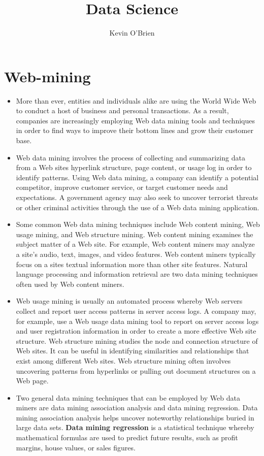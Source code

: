 \documentclass[12pt]{article}
\title{Data Science}
\author{Kevin O'Brien}
\begin{document}
	
	\section*{Web-mining}
	\begin{itemize}
	
	\item More than ever, entities and individuals alike are using the World Wide Web to conduct a host of business and personal transactions. As a result, companies are increasingly employing Web data mining tools and techniques in order to find ways to improve their bottom lines and grow their customer base.
	\item  Web data mining involves the process of collecting and summarizing data from a Web sites hyperlink structure, page content, or usage log in order to identify patterns. Using Web data mining, a company can identify a potential competitor, improve customer service, or target customer needs and expectations. A government agency may also seek to uncover terrorist threats or other criminal activities through the use of a Web data mining application.
	
\item	Some common Web data mining techniques include Web content mining, Web usage mining, and Web structure mining. Web content mining examines the subject matter of a Web site. For example, Web content miners may analyze a site's audio, text, images, and video features. Web content miners typically focus on a sites textual information more than other site features. Natural language processing and information retrieval are two data mining techniques often used by Web content miners.
	
\item Web usage mining is usually an automated process whereby Web servers collect and report user access patterns in server access logs. A company may, for example, use a Web usage data mining tool to report on server access logs and user registration information in order to create a more effective Web site structure. Web structure mining studies the node and connection structure of Web sites. It can be useful in identifying similarities and relationships that exist among different Web sites. Web structure mining often involves uncovering patterns from hyperlinks or pulling out document structures on a Web page.
	
\item	Two general data mining techniques that can be employed by Web data miners are data mining association analysis and data mining regression. Data mining association analysis helps uncover noteworthy relationships buried in large data sets. \textbf{Data mining regression} is a statistical technique whereby mathematical formulas are used to predict future results, such as profit margins, house values, or sales figures.
	

\end{itemize}
\end{document}
